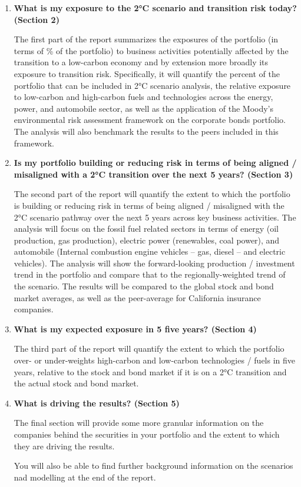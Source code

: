 \documentclass[10pt,twoside,table]{article}\usepackage[]{graphicx}\usepackage[]{color}
\begin{document}
	\begin{enumerate}
		\item{\textbf{What is my exposure to the 2°C scenario and transition risk today? (Section 2)}
		}
		
		The first part of the report summarizes the exposures of the portfolio (in terms of \% of the portfolio) to business activities potentially affected by the transition to a low-carbon economy and by extension more broadly its exposure to transition risk. Specifically, it will quantify the percent of the portfolio that can be included in 2°C scenario analysis, the relative exposure to low-carbon and high-carbon fuels and technologies across the energy, power, and automobile sector, as well as the application of the Moody’s environmental risk assessment framework on the corporate bonds portfolio. The analysis will also benchmark the results to the peers included in this framework.
	
		\item{\textbf{Is my portfolio building or reducing risk in terms of being aligned / misaligned with a 2°C transition over the next 5 years? (Section 3)}
		}
		
		The second part of the report will quantify the extent to which the portfolio is building or reducing risk in terms of being aligned / misaligned with the 2°C scenario pathway over the next 5 years across key business activities. The analysis will focus on the fossil fuel related sectors in terms of energy (oil production, gas production), electric power (renewables, coal power), and automobile (Internal combustion engine vehicles – gas, diesel – and electric vehicles). The analysis will show the forward-looking production / investment trend in the portfolio and compare that to the regionally-weighted trend of the scenario. The results will be compared to the global stock and bond market averages, as well as the peer-average for California insurance companies.
	
		\item{\textbf{What is my expected exposure in 5 five years? (Section 4)}
		}
		
		The third part of the report will quantify the extent to which the portfolio over- or under-weights high-carbon and low-carbon technologies / fuels in five years, relative to the stock and bond market if it is on a 2°C transition and the actual stock and bond market.
		
		\item{\textbf{What is driving the results? (Section 5)}}
		
		The final section will provide some more granular information on the companies behind the securities in your portfolio and the extent to which they are driving the results.
		
		You will also be able to find further background information on the scenarios nad modelling at the end of the report.
		
	
	\end{enumerate}
\end{document}
